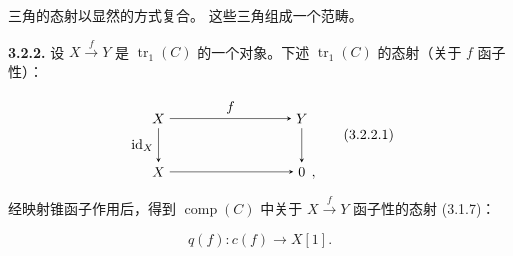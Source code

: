 三角的态射以显然的方式复合。
这些三角组成一个范畴。

\noindent\textbf{3.2.2.}\quad
{}
设 $X\xrightarrow{f}Y$ 是 $\operatorname{tr}_1(C)$ 的一个对象。下述
$\operatorname{tr}_1(C)$ 的态射（关于 $f$ 函子性）：

\begin{equation}
  \begin{tikzpicture}[>=stealth,baseline=(current bounding box.center)]
    \node (X)  at (0,1.35) {$X$};
    \node (Y)  at (3.6,1.35) {$Y$};
    \node (Xp) at (0,0) {$X$};
    \node (Z)  at (3.6,0) {$0$};
    \node[anchor=base west,inner sep=0pt,xshift=.08em] at (Z.base east) {$,$};
    \draw[->] (X) -- node[above] {$f$} (Y);
    \draw[->] (X) -- node[left] {$\operatorname{id}_X$} (Xp);
    \draw[->] (Y) -- (Z);
    \draw[->] (Xp) -- (Z);
  \end{tikzpicture}
  \tag{3.2.2.1}
\end{equation}

经映射锥函子作用后，得到 $\operatorname{comp}(C)$ 中关于
$X\xrightarrow{f}Y$ 函子性的态射 (3.1.7)：

\begin{equation}
  q(f)\colon c(f)\longrightarrow X[1].
  \tag{3.2.2.2}
\end{equation}
